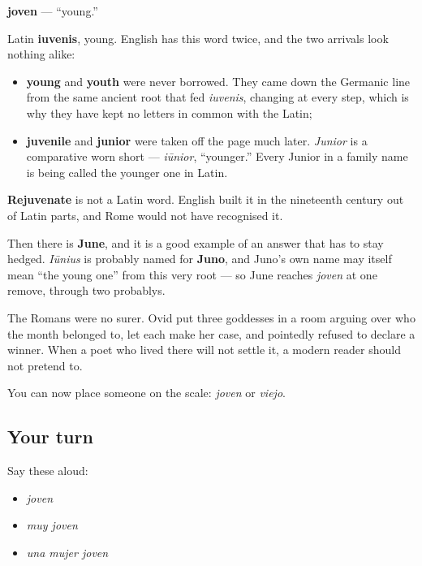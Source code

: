 \begin{cousinweb}
\textbf{joven} — \textquotedblleft{}young.\textquotedblright{}

Latin \textbf{iuvenis}, young. English has this word twice, and the two arrivals look nothing alike:

\begin{itemize}
\raggedright
  \item \textbf{young} and \textbf{youth} were never borrowed. They came down the Germanic line from the same ancient root that fed \emph{iuvenis}, changing at every step, which is why they have kept no letters in common with the Latin;
  \item \textbf{juvenile} and \textbf{junior} were taken off the page much later. \emph{Junior} is a comparative worn short — \emph{iūnior}, \textquotedblleft{}younger.\textquotedblright{} Every Junior in a family name is being called the younger one in Latin.
\end{itemize}

\textbf{Rejuvenate} is not a Latin word. English built it in the nineteenth century out of Latin parts, and Rome would not have recognised it.

Then there is \textbf{June}, and it is a good example of an answer that has to stay hedged. \emph{Iūnius} is probably named for \textbf{Juno}, and Juno's own name may itself mean \textquotedblleft{}the young one\textquotedblright{} from this very root — so June reaches \emph{joven} at one remove, through two probablys.

The Romans were no surer. Ovid put three goddesses in a room arguing over who the month belonged to, let each make her case, and pointedly refused to declare a winner. When a poet who lived there will not settle it, a modern reader should not pretend to.
\end{cousinweb}

\begin{grammarlens}[title={What you've built}]
You can now place someone on the scale: \emph{joven} or \emph{viejo}.
\end{grammarlens}

\subsection*{Your turn}
Say these aloud:

\begin{itemize}
\raggedright
  \item \emph{joven}
  \item \emph{muy joven}
  \item \emph{una mujer joven}
\end{itemize}

